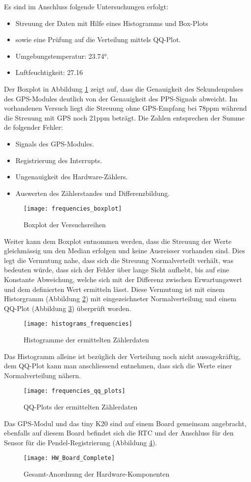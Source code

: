 Es sind im Anschluss folgende Untersuchungen erfolgt:
\begin{itemize}
	\item Streuung der Daten mit Hilfe eines Histogramms und Box-Plots
	\item sowie eine Prüfung auf die Verteilung mittels QQ-Plot.
	\item Umgebungstemperatur: 23.74°.
	\item Luftfeuchtigkeit: 27.16%
\end{itemize}
Der Boxplot in Abbildung \ref{fig:freq_boxplot} zeigt auf, dass die Genauigkeit des Sekundenpulses des GPS-Modules deutlich von der Genauigkeit des PPS-Signals abweicht. Im vorhandenen Versuch liegt die Streuung ohne GPS-Empfang bei 78ppm während die Streuung mit GPS noch 21ppm beträgt. Die Zahlen entsprechen der Summe de folgender Fehler:
\begin{itemize}
	\item Signals des GPS-Modules.
	\item Registrierung des Interrupts.
	\item Ungenauigkeit des Hardware-Zählers.
	\item Auswerten des Zählerstandes und Differenzbildung. 
\end{itemize}
	\begin{figure}[H]
		\centering
		\texttt{[image: frequencies\_boxplot]}
		\caption{Boxplot der Versuchsreihen}
		\label{fig:freq_boxplot}
	\end{figure}
%
Weiter kann dem Boxplot entnommen werden, dass die Streuung der Werte gleichmässig um den Median erfolgen und keine Ausreisser vorhanden sind. Dies legt die Vermutung nahe, dass sich die Streuung Normalverteilt verhält, was bedeuten würde, dass sich der Fehler über lange Sicht aufhebt, bis auf eine Konstante Abweichung, welche sich mit der Differenz zwischen Erwartungswert und dem definierten Wert ermitteln lässt. Diese Vermutung ist mit einem Historgramm (Abbildung \ref{fig:freq_histograms}) mit eingezeichneter Normalverteilung und einem QQ-Plot (Abbildung \ref{fig:freq_qq_plot}) überprüft worden.
	\begin{figure}[H]
		\centering
		\texttt{[image: histograms\_frequencies]}
		\caption{Histogramme der ermittelten Zählerdaten}
		\label{fig:freq_histograms}
	\end{figure}
	Das Histogramm alleine ist bezüglich der Verteilung noch nicht aussagekräftig, dem QQ-Plot kann man anschliessend entnehmen, dass sich die Werte einer Normalverteilung nähern.
	\begin{figure}[H]
		\centering
		\texttt{[image: frequencies\_qq\_plots]}
		\caption{QQ-Plots der ermittelten Zählerdaten}
		\label{fig:freq_qq_plot}
	\end{figure}
Das GPS-Modul und das tiny K20 sind auf einem Board gemeinsam angebracht, ebenfalls auf diesem Board befindet sich die RTC und der Anschluss für den Sensor für die Pendel-Registrierung (Abbildung \ref{fig:hardware_board}).
	\begin{figure}[H]
		\centering
		\texttt{[image: HW\_Board\_Complete]}
		\caption{Gesamt-Anordnung der Hardware-Komponenten}
		\label{fig:hardware_board}
	\end{figure}